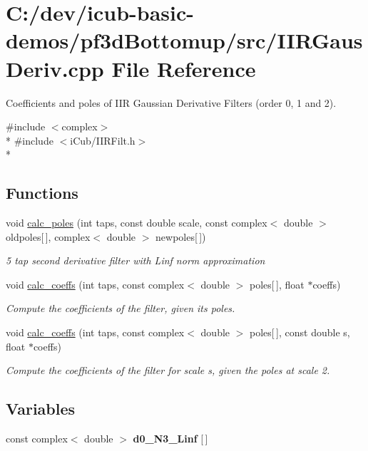 \section{C\+:/dev/icub-\/basic-\/demos/pf3d\+Bottomup/src/\+I\+I\+R\+Gaus\+Deriv.cpp File Reference}
\label{IIRGausDeriv_8cpp}


Coefficients and poles of I\+IR Gaussian Derivative Filters (order 0, 1 and 2).  


{\ttfamily \#include $<$complex$>$}\\*
{\ttfamily \#include $<$i\+Cub/\+I\+I\+R\+Filt.\+h$>$}\\*
\subsection*{Functions}
\begin{DoxyCompactItemize}
\item 
void \hyperlink{IIRGausDeriv_8cpp_a2741eb625282f8d68ba971a4431407a5}{calc\+\_\+poles} (int taps, const double scale, const complex$<$ double $>$ oldpoles\mbox{[}$\,$\mbox{]}, complex$<$ double $>$ newpoles\mbox{[}$\,$\mbox{]})
\begin{DoxyCompactList}\small\item\em 5 tap second derivative filter with Linf norm approximation \end{DoxyCompactList}\item 
void \hyperlink{IIRGausDeriv_8cpp_a3e7f009d38086e228c6ba8b3e5b6055f}{calc\+\_\+coeffs} (int taps, const complex$<$ double $>$ poles\mbox{[}$\,$\mbox{]}, float $\ast$coeffs)
\begin{DoxyCompactList}\small\item\em Compute the coefficients of the filter, given its poles. \end{DoxyCompactList}\item 
void \hyperlink{IIRGausDeriv_8cpp_a3e168333285d90a0bfd848d9791ca427}{calc\+\_\+coeffs} (int taps, const complex$<$ double $>$ poles\mbox{[}$\,$\mbox{]}, const double s, float $\ast$coeffs)
\begin{DoxyCompactList}\small\item\em Compute the coefficients of the filter for scale s, given the poles at scale 2. \end{DoxyCompactList}\end{DoxyCompactItemize}
\subsection*{Variables}
\begin{DoxyCompactItemize}
\item 
const complex$<$ double $>$ {\bfseries d0\+\_\+\+N3\+\_\+\+Linf} \mbox{[}$\,$\mbox{]}
\end{DoxyCompactItemize}


